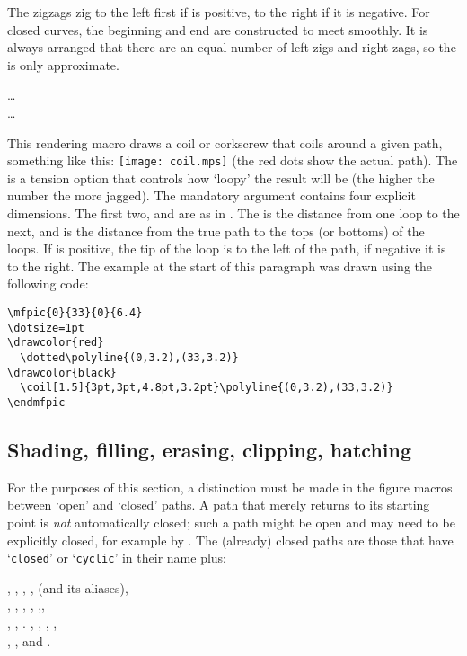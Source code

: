 \documentclass[letterpaper]{article}
\begin{document}
The zigzags zig to the left first if  is positive, to the
right if it is negative. For closed curves, the beginning and end are
constructed to meet smoothly. It is always arranged that there are an
equal number of left zigs and right zags, so the  is only
approximate.


\begin{cd}
%
    \dots\\%
%
    \dots%
%
\end{cd}

This rendering macro draws a coil or corkscrew that coils around a
given path, something like this: \texttt{[image: coil.mps]} (the red
dots show the actual path). The  is a tension option that
controls how `loopy' the result will be (the higher the number the more
jagged). The mandatory argument contains four explicit dimensions. The
first two,  and  are as in . The
 is the distance from one loop to the next, and  is
the distance from the true path to the tops (or bottoms) of the
loops. If  is positive, the tip of the loop is to the left
of the path, if negative it is to the right. The example at the start of
this paragraph was drawn using the following code:
\begin{verbatim}
\mfpic{0}{33}{0}{6.4}
\dotsize=1pt
\drawcolor{red}
  \dotted\polyline{(0,3.2),(33,3.2)}
\drawcolor{black}
  \coil[1.5]{3pt,3pt,4.8pt,3.2pt}\polyline{(0,3.2),(33,3.2)}
\endmfpic
\end{verbatim}


\subsection{Shading, filling, erasing, clipping, hatching}\label{filling}

For the purposes of this section, a distinction must be made in the
figure macros between `open' and `closed' paths. A path that merely
returns to its starting point is \emph{not} automatically closed; such a
path might be open and may need to be explicitly closed, for example by
. The (already) closed paths are those that have
`\texttt{closed}' or `\texttt{cyclic}' in their name plus:
\begin{display}
  , , , ,
     (and its aliases),\\
  , , , ,
    ,,\\ ,
  , . , ,
    , ,\\
  , , and .
\end{display}
\end{document}
